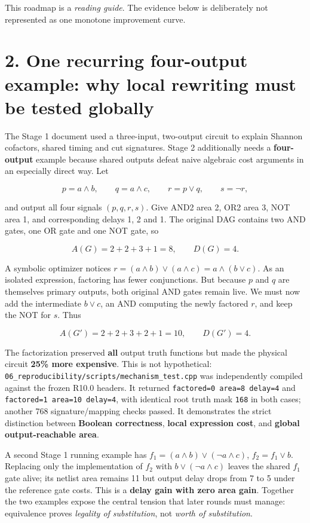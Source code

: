 This roadmap is a \emph{reading guide}. The evidence below is deliberately not represented as one monotone improvement curve.

\section{2. One recurring four-output example: why local rewriting must be tested globally}\label{one-recurring-four-output-example-why-local-rewriting-must-be-tested-globally}

The Stage 1 document used a three-input, two-output circuit to explain Shannon cofactors, shared timing and cut signatures. Stage 2 additionally needs a \textbf{four-output} example because shared outputs defeat naive algebraic cost arguments in an especially direct way. Let

\[
p=a\land b,\qquad q=a\land c,\qquad r=p\lor q,\qquad s=\neg r,
\]

and output all four signals \((p,q,r,s)\). Give AND2 area 2, OR2 area 3, NOT area 1, and corresponding delays 1, 2 and 1. The original DAG contains two AND gates, one OR gate and one NOT gate, so

\[
A(G)=2+2+3+1=8, \qquad D(G)=4.
\]

A symbolic optimizer notices \(r=(a\land b)\lor(a\land c)=a\land(b\lor c)\). As an isolated expression, factoring has fewer conjunctions. But because \(p\) and \(q\) are themselves primary outputs, both original AND gates remain live. We must now add the intermediate \(b\lor c\), an AND computing the newly factored \(r\), and keep the NOT for \(s\). Thus

\[
A(G')=2+2+3+2+1=10,\qquad D(G')=4.
\]

The factorization preserved \textbf{all} output truth functions but made the physical circuit \textbf{25\% more expensive}. This is not hypothetical: \texttt{06\_reproducibility/scripts/mechanism\_test.cpp} was independently compiled against the frozen R10.0 headers. It returned \texttt{factored=0\ area=8\ delay=4} and \texttt{factored=1\ area=10\ delay=4}, with identical root truth mask \texttt{168} in both cases; another 768 signature/mapping checks passed. It demonstrates the strict distinction between \textbf{Boolean correctness}, \textbf{local expression cost}, and \textbf{global output-reachable area}.

A second Stage 1 running example has \(f_1=(a\land b)\lor(\neg a\land c)\), \(f_2=f_1\lor b\). Replacing only the implementation of \(f_2\) with \(b\lor(\neg a\land c)\) leaves the shared \(f_1\) gate alive; its netlist area remains 11 but output delay drops from 7 to 5 under the reference gate costs. This is a \textbf{delay gain with zero area gain}. Together the two examples expose the central tension that later rounds must manage: equivalence proves \emph{legality of substitution}, not \emph{worth of substitution}.

